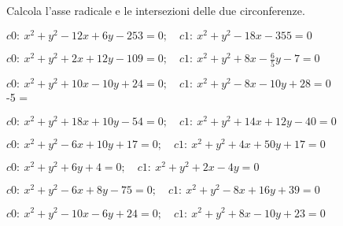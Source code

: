 \begin{esercizio}\label{ese:}
 Calcola l'asse radicale e le intersezioni delle due circonferenze.
 \begin{enumeratea}
  \item  \(c0:~x^2 + y^2 -12x +6y -253 = 0; \quad c1:~x^2 + y^2 -18x -355 = 
0\)\\
  \makebox[\linewidth][r]
   {[\(ar:~y = - x -17;~A \left (-11;~-6 \right );~B \left (-20;~3 
\right )\)]}
  \item  \(c0:~x^2 + y^2 +2x +12y -109 = 0; \quad c1:~x^2 + y^2 +8x 
-\frac{6}{5}y 
-7 = 0\)\\
  \makebox[\linewidth][r]
   {[\(ar:~y = \frac{5}{11} x +\frac{85}{11};~A \left (-6;~5 \right )\)]}
  \item  \(c0:~x^2 + y^2 +10x -10y +24 = 0; \quad c1:~x^2 + y^2 -8x -10y +28 
= 
0\)\\
  \makebox[\linewidth][r]
   {[\(ar:~x = \frac{2}{9};~\emptyset\)]}
-5 = 
  \item  \(c0:~x^2 + y^2 +18x +10y -54 = 0; \quad c1:~x^2 + y^2 +14x +12y 
-40 = 
0\)\\
  \makebox[\linewidth][r]
   {[\(ar:~y = 2 x -7;~A \left (3;~-1 \right );~B \left (-17;~-5 \right 
)\)]}
  \item  \(c0:~x^2 + y^2 -6x +10y +17 = 0; \quad c1:~x^2 + y^2 +4x +50y +17 
= 
0\)\\
  \makebox[\linewidth][r]
   {[\(ar:~y = -\frac{1}{4} x ;~A \left (4;~-1 \right )\)]}
  \item  \(c0:~x^2 + y^2 +6y +4 = 0; \quad c1:~x^2 + y^2 +2x -4y  = 0\)\\
  \makebox[\linewidth][r]
   {[\(ar:~y = \frac{1}{5} x -\frac{2}{5};~\emptyset\)]}
  \item  \(c0:~x^2 + y^2 -6x +8y -75 = 0; \quad c1:~x^2 + y^2 -8x +16y +39 = 
0\)\\
  \makebox[\linewidth][r]
   {[\(ar:~y = \frac{1}{4} x -\frac{57}{4};~A \left (9;~-12 \right );~B 
\left (-\frac{236}{17};~\frac{25}{17} \right )\)]}
  \item  \(c0:~x^2 + y^2 -10x -6y +24 = 0; \quad c1:~x^2 + y^2 +8x -10y +23 
= 
0\)\\
  \makebox[\linewidth][r]
   {[\(ar:~y = \frac{9}{2} x -\frac{1}{4};~\emptyset\)]}

\end{enumeratea}
\end{esercizio}
